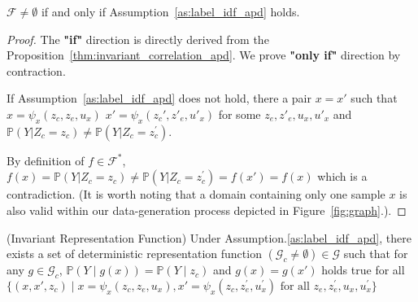 \begin{corollary}
    $\mathcal{F}\neq \emptyset$ if and only if Assumption~\ref{as:label_idf_apd} holds.
    \label{thm:existence_apd}
\end{corollary}

\begin{proof}

    The \textbf{"if"} direction is directly derived from the Proposition~\ref{thm:invariant_correlation_apd}.  We prove \textbf{"only if"} direction by contraction.

    If Assumption~\ref{as:label_idf_apd} does not hold, there a pair $x=x'$ such that $x= \psi_x(z_c,z_e,u_x)$ $x'=\psi_x(z_c',z'_e,u'_x)$ for some $z_e, z'_e, u_x, u'_x$ and $\mathbb{P}(Y|Z_c=z_c) \neq \mathbb{P}(Y|Z_c=z^{'}_c)$.

    By definition of $f\in\mathcal{F}^*$, $f(x)=\mathbb{P}(Y|Z_c=z_c)\neq \mathbb{P}(Y|Z_c=z^{'}_c)=f(x')=f(x)$ which is a contradiction. (It is worth noting that a domain containing only one sample $x$ is also valid within our data-generation process depicted in Figure~\ref{fig:graph}.).
\end{proof}



\begin{proposition} (Invariant Representation Function)
Under Assumption.\ref{as:label_idf_apd}, there exists a set of deterministic representation function $(\mathcal{G}_c\neq \emptyset)\in \mathcal{G}$ such that for any $g\in \mathcal{G}_c$, $\mathbb{P}(Y\mid g(x)) = \mathbb{P}(Y\mid z_c)$ and $g(x)=g(x')$ holds true for all $\{(x,x',z_c)\mid  x= \psi_x(z_c, z_e, u_x), x'= \psi_x(z_c, z^{'}_e, u^{'}_x) \text{ for all }z_e,z^{'}_e, u_x, u^{'}_x\}$
\label{thm:invariant_correlation_apd}
\end{proposition}

